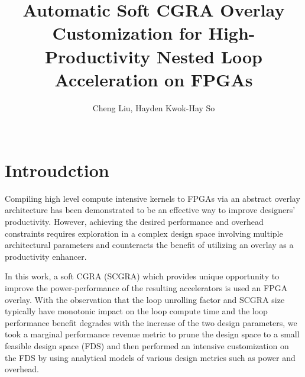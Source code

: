 \documentclass{acm_proc_article-sp}
\begin{document}
\title{Automatic Soft CGRA Overlay Customization for High-Productivity 
Nested Loop Acceleration on FPGAs}

 \author{
 \alignauthor
 Cheng Liu, Hayden Kwok-Hay So\\
        \\
 }
\maketitle


\section{Introudction} \label{introduction}
Compiling high level compute intensive kernels 
to FPGAs via an abstract overlay architecture 
has been demonstrated to be an effective way to 
improve designers' productivity. 
However, achieving the desired performance and 
overhead constraints requires exploration in a 
complex design space involving multiple 
architectural parameters and counteracts 
the benefit of utilizing an overlay 
as a productivity enhancer.

In this work, a soft CGRA (SCGRA) which provides unique 
opportunity to improve the power-performance of the 
resulting accelerators is used an FPGA overlay. 
With the observation that the loop unrolling factor and SCGRA size 
typically have monotonic 
impact on the loop compute time and the loop performance 
benefit degrades with the increase of the two design parameters, 
we took a marginal performance revenue metric to prune the 
design space to a small feasible design space (FDS) and then 
performed an intensive customization on the 
FDS by using analytical models of various design metrics 
such as power and overhead.
\end{document}
